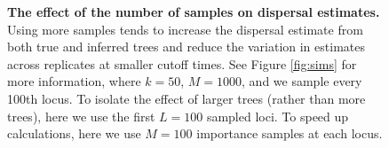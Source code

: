 \documentclass[12pt]{article}
\begin{document}
\begin{figure}[!htb]
\begin{center}

\end{center}

\caption{
\textbf{The effect of the number of samples on dispersal estimates.}
Using more samples tends to increase the dispersal estimate from both true and inferred trees and reduce the variation in estimates across replicates at smaller cutoff times.
See Figure \ref{fig:sims} for more information, where $k=50$, $M=1000$, and we sample every 100th locus. 
To isolate the effect of larger trees (rather than more trees), here we use the first $L=100$ sampled loci.
To speed up calculations, here we use $M=100$ importance samples at each locus. 
}

\label{fig:sup_sigma_samples}
\end{figure}


\end{document}
